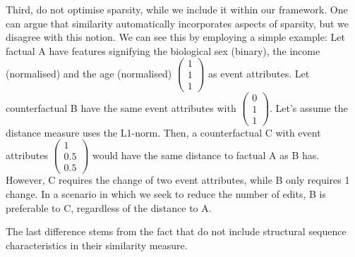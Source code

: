\documentclass[./../../paper.tex]{subfiles}
\begin{document}
Third, \citeauthor{hsieh_DiCE4ELInterpretingProcess_2021} do not optimise sparsity, while we include it within our framework. One can argue that similarity automatically incorporates aspects of sparsity, but we disagree with this notion. We can see this by employing a simple example: Let factual A have features signifying the biological sex (binary), the income (normalised) and the age (normalised) $\begin{pmatrix}1\\1\\1\end{pmatrix}$ as event attributes. Let counterfactual B have the same event attributes with $\begin{pmatrix}0\\1\\1\end{pmatrix}$. Let's assume the distance measure uses the L1-norm. Then, a counterfactual C with event attributes $\begin{pmatrix}1\\0.5\\0.5\end{pmatrix}$ would have the same distance to factual A as B has. However, C requires the change of two event attributes, while B only requires 1 change. In a scenario in which we seek to reduce the number of edits, B is preferable to C, regardless of the distance to A.

The last difference stems from the fact that \citeauthor{hsieh_DiCE4ELInterpretingProcess_2021} do not include structural sequence characteristics in their similarity measure. 
\end{document}
